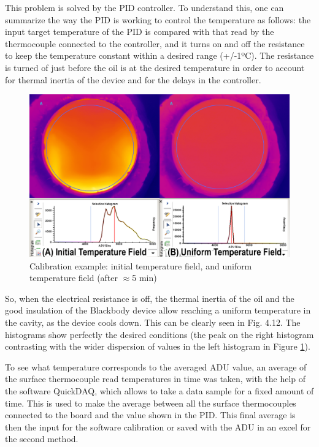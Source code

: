 \par This problem is solved by the PID controller. To understand this, one can summarize the way the PID is working to control the temperature as follows: the input target temperature of the PID is compared with that read by the thermocouple connected to the controller, and it turns on and off the resistance to keep the temperature constant within a desired range (+/-1ºC). The resistance is turned of just before the oil is at the desired temperature in order to account for thermal inertia of the device and for the delays in the controller.\\

\begin{figure}[h]
\centering
\includegraphics[width=0.9\linewidth]{Figures/4.Chapter/ex2.png}
\caption{Calibration example: initial temperature field, and uniform temperature field (after $\approx$5 min)}
\label{fig:ex2}
\end{figure}

\par So, when the electrical resistance is off, the thermal inertia of the oil and the good insulation of the Blackbody device allow reaching a uniform temperature in the cavity, as the device cools down. This can be clearly seen in Fig. 4.12.
The histograms show perfectly the desired conditions (the peak on the right histogram contrasting with the wider dispersion of values in the left histogram in Figure \ref{fig:ex2}). \\

\par To see what temperature corresponds to the averaged ADU value, an average of the surface thermocouple read temperatures in time was taken, with the help of the software QuickDAQ, which allows to take a data sample for a fixed amount of time. This is used to make the average between all the surface thermocouples connected to the board and the value shown in the PID. This final average is then the input for the software calibration or saved with the ADU in an excel for the second method. \\

